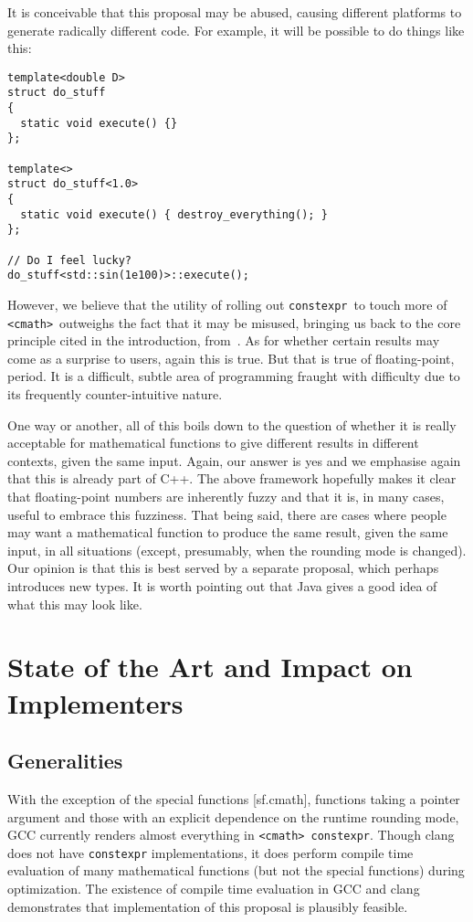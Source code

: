 \documentclass[prd,twocolumn,amsmath,amssymb,nofootinbib,eqsecnum]{revtex4-1}
\newcommand{\constexpr}{\code{constexpr}\xspace}
\newcommand{\code}[1]{{\tt #1}}
\newcommand{\header}[1]{{\tt <#1>}}
\newcommand{\cmath}{\header{cmath}}
\begin{document}
It is conceivable that this proposal may be abused, causing different platforms to generate radically
different code. For example, it will be possible to do things like this:
\begin{verbatim}
template<double D>
struct do_stuff
{
  static void execute() {}
};

template<>
struct do_stuff<1.0>
{
  static void execute() { destroy_everything(); }
};

// Do I feel lucky?
do_stuff<std::sin(1e100)>::execute();
\end{verbatim}

However, we believe that the utility of rolling out \constexpr\ to touch more of \cmath\ outweighs the fact that it may be misused, bringing us back to the core principle cited in the introduction, from~\cite{DandE}.
As for whether certain results may come as a surprise to users, again this is true. But that
is true of floating-point, period. It is a difficult, subtle area of programming fraught with difficulty
due to its frequently counter-intuitive nature.

One way or another, all of this boils down to the question of whether it is really acceptable for mathematical functions to give different results in different contexts, given the same input. Again, our answer is yes and we emphasise again that this is already part of C++. The above framework hopefully makes it clear that floating-point numbers are inherently fuzzy and that it is, in many cases, useful to embrace this fuzziness. That being said, there are cases where people may want a mathematical function to produce the same result, given the same input, in all situations (except, presumably, when the rounding mode is changed). Our opinion is that this is best served by a separate proposal, which
perhaps introduces new types. It is worth pointing out that Java gives a good idea of what this
may look like.


\section{State of the Art and Impact on Implementers}

\subsection{Generalities}

With the exception of the special functions [sf.cmath], functions taking a pointer argument and those with an explicit dependence on the runtime rounding mode, GCC currently renders almost everything in \cmath\ \constexpr. Though clang does not have \constexpr implementations, it does perform compile time evaluation of many mathematical functions (but not the special functions) during optimization. The existence of compile time evaluation in GCC and clang demonstrates that implementation of this proposal is plausibly feasible.
\end{document}
